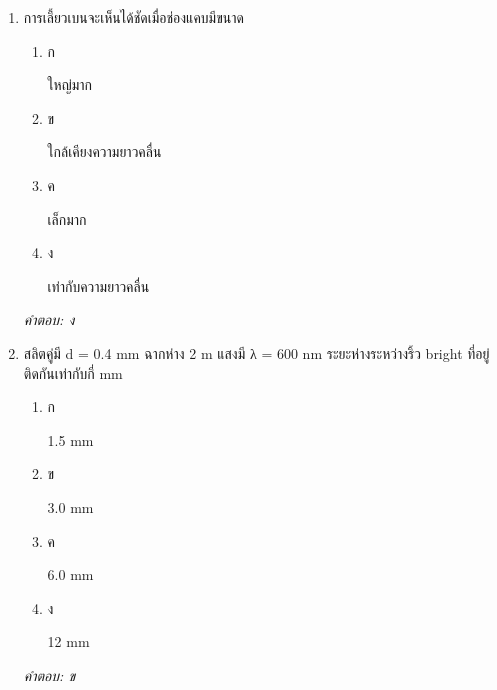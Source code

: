 \documentclass[12pt]{article}
\begin{document}
\begin{enumerate}[label=\arabic*., itemsep=0.5\baselineskip, topsep=0.5\baselineskip, leftmargin=*]
\item การเลี้ยวเบนจะเห็นได้ชัดเมื่อช่องแคบมีขนาด
\begin{enumerate}[label=\alph*)., itemsep=0.3\baselineskip, topsep=0.3\baselineskip]
\item ก\ 
\begin{minipage}[t]{0.9\linewidth}
\raggedright ใหญ่มาก
\end{minipage}
\item ข\ 
\begin{minipage}[t]{0.9\linewidth}
\raggedright ใกล้เคียงความยาวคลื่น
\end{minipage}
\item ค\ 
\begin{minipage}[t]{0.9\linewidth}
\raggedright เล็กมาก
\end{minipage}
\item ง\ 
\begin{minipage}[t]{0.9\linewidth}
\raggedright เท่ากับความยาวคลื่น
\end{minipage}
\end{enumerate}
\vspace{-0.3\baselineskip}
\begin{small}
\textit{คำตอบ: ง}
\end{small}

\item สลิตคู่มี d = 0.4 mm ฉากห่าง 2 m แสงมี λ = 600 nm ระยะห่างระหว่างริ้ว bright ที่อยู่ติดกันเท่ากับกี่ mm
\begin{enumerate}[label=\alph*)., itemsep=0.3\baselineskip, topsep=0.3\baselineskip]
\item ก\ 
\begin{minipage}[t]{0.9\linewidth}
\raggedright 1.5 mm
\end{minipage}
\item ข\ 
\begin{minipage}[t]{0.9\linewidth}
\raggedright 3.0 mm
\end{minipage}
\item ค\ 
\begin{minipage}[t]{0.9\linewidth}
\raggedright 6.0 mm
\end{minipage}
\item ง\ 
\begin{minipage}[t]{0.9\linewidth}
\raggedright 12 mm
\end{minipage}
\end{enumerate}
\vspace{-0.3\baselineskip}
\begin{small}
\textit{คำตอบ: ข}
\end{small}


\end{enumerate}
\end{document}
